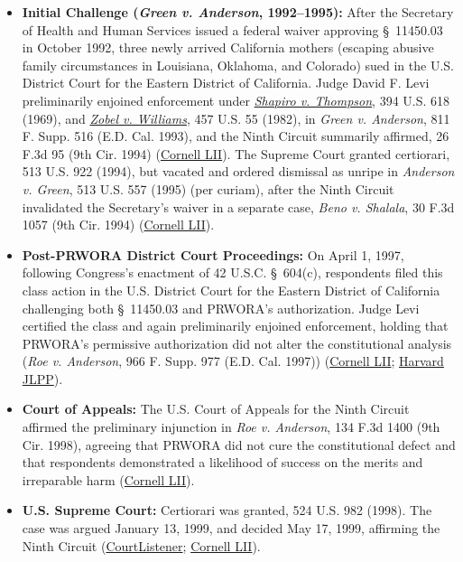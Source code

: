 \documentclass[12pt]{article}
\begin{document}
\begin{itemize}
\item \textbf{Initial Challenge (\textit{Green v. Anderson}, 1992--1995):} After the Secretary of Health and Human Services issued a federal waiver approving \S~11450.03 in October 1992, three newly arrived California mothers (escaping abusive family circumstances in Louisiana, Oklahoma, and Colorado) sued in the U.S. District Court for the Eastern District of California. Judge David F. Levi preliminarily enjoined enforcement under \href{https://supreme.justia.com/cases/federal/us/394/618/}{\textit{Shapiro v. Thompson}}, 394 U.S. 618 (1969), and \href{https://supreme.justia.com/cases/federal/us/457/55/}{\textit{Zobel v. Williams}}, 457 U.S. 55 (1982), in \textit{Green v. Anderson}, 811 F. Supp. 516 (E.D. Cal. 1993), and the Ninth Circuit summarily affirmed, 26 F.3d 95 (9th Cir. 1994) (\href{https://www.law.cornell.edu/supremecourt/text/98-97}{Cornell LII}). The Supreme Court granted certiorari, 513 U.S. 922 (1994), but vacated and ordered dismissal as unripe in \textit{Anderson v. Green}, 513 U.S. 557 (1995) (per curiam), after the Ninth Circuit invalidated the Secretary's waiver in a separate case, \textit{Beno v. Shalala}, 30 F.3d 1057 (9th Cir. 1994) (\href{https://www.law.cornell.edu/supremecourt/text/98-97}{Cornell LII}).
\item \textbf{Post-PRWORA District Court Proceedings:} On April 1, 1997, following Congress's enactment of 42 U.S.C. \S~604(c), respondents filed this class action in the U.S. District Court for the Eastern District of California challenging both \S~11450.03 and PRWORA's authorization. Judge Levi certified the class and again preliminarily enjoined enforcement, holding that PRWORA's permissive authorization did not alter the constitutional analysis (\textit{Roe v. Anderson}, 966 F. Supp. 977 (E.D. Cal. 1997)) (\href{https://www.law.cornell.edu/supremecourt/text/98-97}{Cornell LII}; \href{https://journals.law.harvard.edu/jlpp/wp-content/uploads/sites/90/2026/03/30_23HarvJLPubPoly2951999-2000.pdf}{Harvard JLPP}).
\item \textbf{Court of Appeals:} The U.S. Court of Appeals for the Ninth Circuit affirmed the preliminary injunction in \textit{Roe v. Anderson}, 134 F.3d 1400 (9th Cir. 1998), agreeing that PRWORA did not cure the constitutional defect and that respondents demonstrated a likelihood of success on the merits and irreparable harm (\href{https://www.law.cornell.edu/supremecourt/text/98-97}{Cornell LII}).
\item \textbf{U.S. Supreme Court:} Certiorari was granted, 524 U.S. 982 (1998). The case was argued January 13, 1999, and decided May 17, 1999, affirming the Ninth Circuit (\href{https://www.courtlistener.com/opinion/118286/saenz-v-roe/}{CourtListener}; \href{https://www.law.cornell.edu/supremecourt/text/98-97}{Cornell LII}).
\end{itemize}
\end{document}
